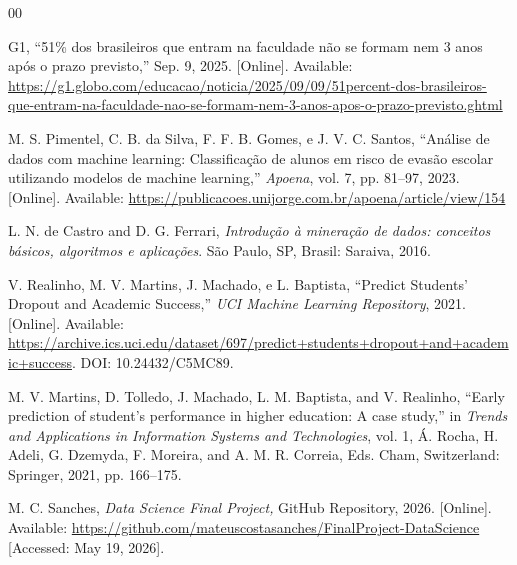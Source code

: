 
\begin{thebibliography}{00}

G1, ``51\% dos brasileiros que entram na faculdade não se formam nem 3 anos após o prazo previsto,'' Sep. 9, 2025. [Online]. 
Available:
\url{https://g1.globo.com/educacao/noticia/2025/09/09/51percent-dos-brasileiros-que-entram-na-faculdade-nao-se-formam-nem-3-anos-apos-o-prazo-previsto.ghtml}

M. S. Pimentel, C. B. da Silva, F. F. B. Gomes, e J. V. C. Santos, ``Análise de dados com machine learning: Classificação de alunos em risco de evasão escolar utilizando modelos de machine learning,'' \textit{Apoena}, vol. 7, pp. 81--97, 2023. [Online]. Available: \url{https://publicacoes.unijorge.com.br/apoena/article/view/154}

L. N. de Castro and D. G. Ferrari, \textit{Introdução à mineração de dados: conceitos básicos, algoritmos e aplicações}. São Paulo, SP, Brasil: Saraiva, 2016.

V. Realinho, M. V. Martins, J. Machado, e L. Baptista, ``Predict Students' Dropout and Academic Success,'' \textit{UCI Machine Learning Repository}, 2021. [Online]. Available: \url{https://archive.ics.uci.edu/dataset/697/predict+students+dropout+and+academic+success}. DOI: 10.24432/C5MC89.

M. V. Martins, D. Tolledo, J. Machado, L. M. Baptista, and V. Realinho, ``Early prediction of student's performance in higher education: A case study,'' in \textit{Trends and Applications in Information Systems and Technologies}, vol. 1, Á. Rocha, H. Adeli, G. Dzemyda, F. Moreira, and A. M. R. Correia, Eds. Cham, Switzerland: Springer, 2021, pp. 166--175.

M. C. Sanches, \textit{Data Science Final Project,} GitHub Repository, 2026. [Online].
Available:
\url{https://github.com/mateuscostasanches/FinalProject-DataScience}
[Accessed: May 19, 2026].

\end{thebibliography}
